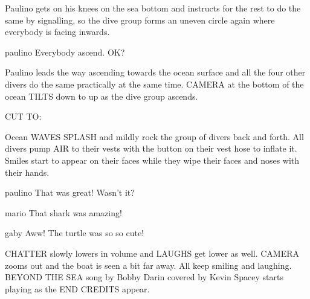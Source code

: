 \documentclass{screenplay}
\begin{document}
Paulino gets on his knees on the sea bottom and instructs for the rest to do the same by signalling, so the dive group forms an uneven circle again where everybody is facing inwards.

\begin{dialogue}{paulino}
Everybody ascend. OK?
\end{dialogue}

Paulino leads the way ascending towards the ocean surface and all the four other divers do the same practically at the same time. CAMERA at the bottom of the ocean TILTS down to up as the dive group ascends.

CUT TO:

Ocean WAVES SPLASH and mildly rock the group of divers back and forth. All divers pump AIR to their vests with the button on their vest hose to inflate it. Smiles start to appear on their faces while they wipe their faces and noses with their hands.

\begin{dialogue}{paulino}
That was great! Wasn't it?
\end{dialogue}

\begin{dialogue}{mario}
That shark was amazing!
\end{dialogue}

\begin{dialogue}{gaby}
Aww! The turtle was so so cute!
\end{dialogue}

CHATTER slowly lowers in volume and LAUGHS get lower as well. CAMERA zooms out and the boat is seen a bit far away. All keep smiling and laughing. BEYOND THE SEA song by Bobby Darin covered by Kevin Spacey starts playing as the END CREDITS appear.

\fadeout
\theend
\end{document}
